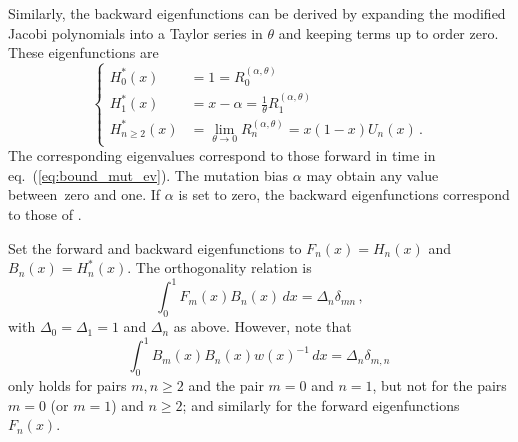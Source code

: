 \documentclass[preprint]{elsarticle}
\begin{document}
Similarly, the backward eigenfunctions can be derived by expanding the modified Jacobi polynomials into a Taylor series in $\theta$ and keeping terms up to order zero. These eigenfunctions are
\begin{equation}\label{eq:backw_Us}
\begin{cases}
    H_0^{*}(x)&=1=R_0^{(\alpha,\theta)}\\
    H_1^{*}(x)&=x-\alpha=\frac{1}{\theta}R_1^{(\alpha,\theta)}\\
    H_{n\geq2}^{*}(x)&=\lim_{\theta\to0}R_n^{(\alpha,\theta)}=x(1-x)U_n(x)\,.
\end{cases}
\end{equation}
The corresponding eigenvalues correspond to those forward in time in eq.~(\ref{eq:bound_mut_ev}). The mutation bias $\alpha$ may obtain any value between zero and one. If $\alpha$ is set to zero, the backward eigenfunctions correspond to those of \citet{Tran14b}. 

Set the forward and backward eigenfunctions to $F_n(x)=H_n(x)$ and $B_n(x)=H_n^*(x)$. The orthogonality relation is
\begin{equation}\label{eq:ortho_rel_pure_drift}
\int_0^1 F_m(x) B_n(x)\,dx=\Delta_n \delta_{mn}\,,
\end{equation}
with $\Delta_0=\Delta_1=1$ and $\Delta_n$ as above. However, note that 
\begin{equation}
\int_0^1 B_m(x) B_n(x) w(x)^{-1} \,dx=\Delta_n \delta_{m,n}\,
\end{equation}
only holds for pairs $m,n\geq 2$ and the pair $m=0$ and $n=1$, but not for the pairs $m=0$ (or $m=1$) and $n\geq 2$; and similarly for the forward eigenfunctions $F_n(x)$. %
\end{document}
